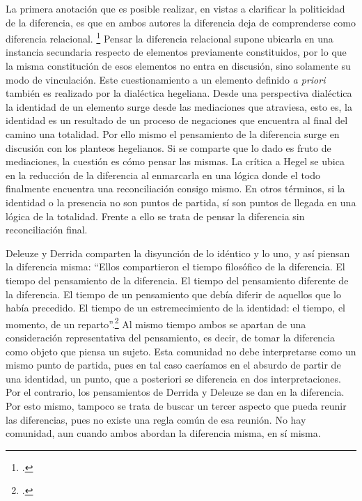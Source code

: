 La primera anotación que es posible realizar, en vistas a clarificar la politicidad de la diferencia, es que en ambos autores la diferencia deja de comprenderse como diferencia relacional. \footcite[En este sentido, la diferencia es también la relación con lo sin-relación, con el afuera: \enquote{Lo otro antes de ser mi otro, es decir, el opuesto o la negación de mí \emph{mismo}, es el \emph{afuera} que no deja de habitarme, de repetirme y alterarme al punto en que yo no tengo ya identidad alguna, de espaciarme, diferenciarme, divergirme, aun cuando en este espaciamiento yo no haya tenido nunca identidad ni egoidad alguna, no haya tenido jamás palabra}.][126]{@6985-MENGUE2008} Pensar la diferencia relacional supone ubicarla en una instancia secundaria respecto de elementos previamente constituidos, por lo que la misma constitución de esos elementos no entra en discusión, sino solamente su modo de vinculación. Este cuestionamiento a un elemento definido \emph{a priori} también es realizado por la dialéctica hegeliana. Desde una perspectiva dialéctica la identidad de un elemento surge desde las mediaciones que atraviesa, esto es, la identidad es un resultado de un proceso de negaciones que encuentra al final del camino una totalidad. Por ello mismo el pensamiento de la diferencia surge en discusión con los planteos hegelianos. Si se comparte que lo dado es fruto de mediaciones, la cuestión es cómo pensar las mismas. La crítica a Hegel se ubica en la reducción de la diferencia al enmarcarla en una lógica donde el todo finalmente encuentra una reconciliación consigo mismo. En otros términos, si la identidad o la presencia no son puntos de partida, sí son puntos de llegada en una lógica de la totalidad. Frente a ello se trata de pensar la diferencia sin reconciliación final.

Deleuze y Derrida comparten la disyunción de lo idéntico y lo uno, y así piensan la diferencia misma: \enquote{Ellos compartieron el tiempo filosófico de la diferencia. El tiempo del pensamiento de la diferencia. El tiempo del pensamiento diferente de la diferencia. El tiempo de un pensamiento que debía diferir de aquellos que lo había precedido. El tiempo de un estremecimiento de la identidad: el tiempo, el momento, de un reparto}.\footcite[250]{@6986-NANCY2008} Al mismo tiempo ambos se apartan de una consideración representativa del pensamiento, es decir, de tomar la diferencia como objeto que piensa un sujeto. Esta comunidad no debe interpretarse como un mismo punto de partida, pues en tal caso caeríamos en el absurdo de partir de una identidad, un punto, que a posteriori se diferencia en dos interpretaciones. Por el contrario, los pensamientos de Derrida y Deleuze se dan en la diferencia. Por esto mismo, tampoco se trata de buscar un tercer aspecto que pueda reunir las diferencias, pues no existe una regla común de esa reunión. No hay comunidad, aun cuando ambos abordan la diferencia misma, en sí misma.

